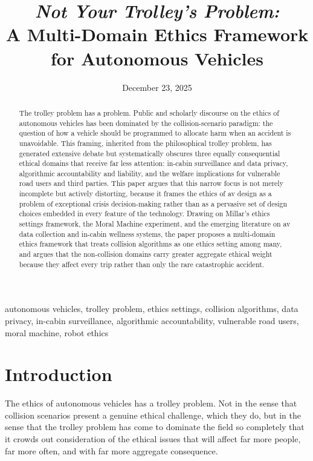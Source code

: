\documentclass{ieee-portfolio}
\title{\textit{Not Your Trolley's Problem:}\\
A Multi-Domain Ethics Framework for Autonomous Vehicles}
\date{December 23, 2025}
\author{
    \IEEEauthorblockN{Jaxen Anirban Dutta\,\orcidlink{0009-0002-5088-4679}}
    \IEEEauthorblockA{\textit{School of Engineering Design and Teaching Innovation} \\
    \textit{University of Ottawa, Ottawa, Ontario, Canada} \\
    adutt042@uottawa.ca}
}
\begin{document}
\maketitle

\begin{abstract}
The trolley problem has a problem. Public and scholarly discourse on the ethics of autonomous vehicles has been dominated by the collision-scenario paradigm: the question of how a vehicle should be programmed to allocate harm when an accident is unavoidable. This framing, inherited from the philosophical trolley problem, has generated extensive debate but systematically obscures three equally consequential ethical domains that receive far less attention: in-cabin surveillance and data privacy, algorithmic accountability and liability, and the welfare implications for vulnerable road users and third parties. This paper argues that this narrow focus is not merely incomplete but actively distorting, because it frames the ethics of \gls{av} design as a problem of exceptional crisis decision-making rather than as a pervasive set of design choices embedded in every feature of the technology. Drawing on Millar's ethics settings framework, the Moral Machine experiment, and the emerging literature on \gls{av} data collection and in-cabin wellness systems, the paper proposes a multi-domain ethics framework that treats collision algorithms as one ethics setting among many, and argues that the non-collision domains carry greater aggregate ethical weight because they affect every trip rather than only the rare catastrophic accident.
\end{abstract}

\begin{IEEEkeywords}
autonomous vehicles, trolley problem, ethics settings, collision algorithms, data privacy, in-cabin surveillance, algorithmic accountability, vulnerable road users, moral machine, robot ethics
\end{IEEEkeywords}

\section{Introduction}
 
The ethics of autonomous vehicles has a trolley problem. Not in the sense that collision scenarios present a genuine ethical challenge, which they do, but in the sense that the trolley problem has come to dominate the field so completely that it crowds out consideration of the ethical issues that will affect far more people, far more often, and with far more aggregate consequence.
 
\end{document}
